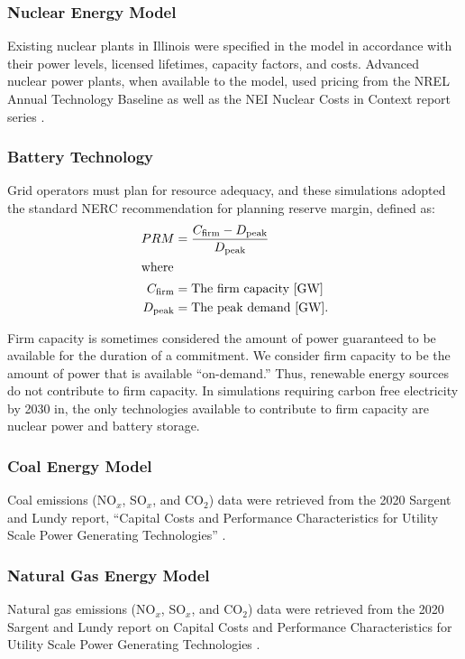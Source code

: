 \subsubsection{Nuclear Energy Model}
Existing nuclear plants in Illinois were specified in the model in accordance with their 
power levels, licensed lifetimes, capacity factors, and costs. Advanced nuclear power plants, 
when available to the model, used pricing from the \gls{NREL} Annual Technology 
Baseline as well as the \gls{NEI} Nuclear Costs in Context report series
\cite{desai_nuclear_2020,desai_nuclear_2018}.

\subsubsection{Battery Technology}

Grid operators must plan for resource adequacy, and these simulations adopted the standard \gls{NERC} recommendation for planning reserve margin, defined as: 
\begin{align}
         PRM &= \frac{ C_{\text{firm}} - D_{\text{peak}} }{ D_{\text{peak}} }\\
        \intertext{where}
        C_{\text{firm}} &= \text{The firm capacity  [GW]}\nonumber\\
        D_{\text{peak}} &= \text{The peak demand  [GW]}.\nonumber
\end{align}

Firm capacity is sometimes considered the amount of power guaranteed to be
available for the duration of a commitment. We consider firm capacity to be the
amount of power that is available ``on-demand.'' Thus, renewable energy sources
do not contribute to firm capacity. In simulations requiring carbon free
electricity by 2030 in, the only technologies available to contribute to firm
capacity are nuclear power and battery storage. 

\subsubsection{Coal Energy Model}
Coal emissions (NO$_x$, SO$_x$, and CO$_2$) data were retrieved from the 2020 
Sargent and Lundy report, ``Capital Costs and Performance Characteristics for 
Utility Scale Power Generating Technologies'' \cite{sargent__lundy_capital_2020}.

\subsubsection{Natural Gas Energy Model}
Natural gas emissions (NO$_x$, SO$_x$, and CO$_2$) data were retrieved from the 
2020 Sargent and Lundy report on Capital Costs and Performance Characteristics 
for Utility Scale Power Generating Technologies 
\cite{sargent__lundy_capital_2020}.
